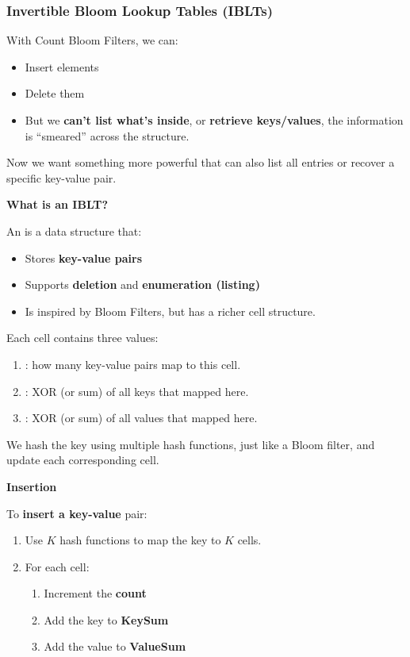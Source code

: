 \subsubsection{Invertible Bloom Lookup Tables (IBLTs)}

With Count Bloom Filters, we can:
\begin{itemize}
    \item Insert elements
    \item Delete them
    \item But we \textbf{can't list what's inside}, or \textbf{retrieve keys/values}, the information is ``smeared'' across the structure.
\end{itemize}
Now we want something more powerful that can also list all entries or recover a specific key-value pair.

\highspace
\begin{flushleft}
    \textcolor{Green3}{ \textbf{What is an IBLT?}}
\end{flushleft}
An  is a data structure that:
\begin{itemize}
    \item Stores \textbf{key-value pairs}
    \item Supports \textbf{deletion} and \textbf{enumeration (listing)}
    \item Is inspired by Bloom Filters, but has a richer cell structure.
\end{itemize}
Each cell contains three values:
\begin{enumerate}
    \item {}: how many key-value pairs map to this cell.
    \item {}: XOR (or sum) of all keys that mapped here.
    \item {}: XOR (or sum) of all values that mapped here.
\end{enumerate}
We hash the key using multiple hash functions, just like a Bloom filter, and update each corresponding cell.

\highspace
\begin{flushleft}
    \textcolor{Green3}{ \textbf{Insertion}}
\end{flushleft}
To \textbf{insert a key-value} pair:
\begin{enumerate}
    \item Use $K$ hash functions to map the key to $K$ cells.
    \item For each cell:
    \begin{enumerate}
        \item Increment the \textbf{count}
        \item Add the key to \textbf{KeySum}
        \item Add the value to \textbf{ValueSum}
    \end{enumerate}
\end{enumerate}

